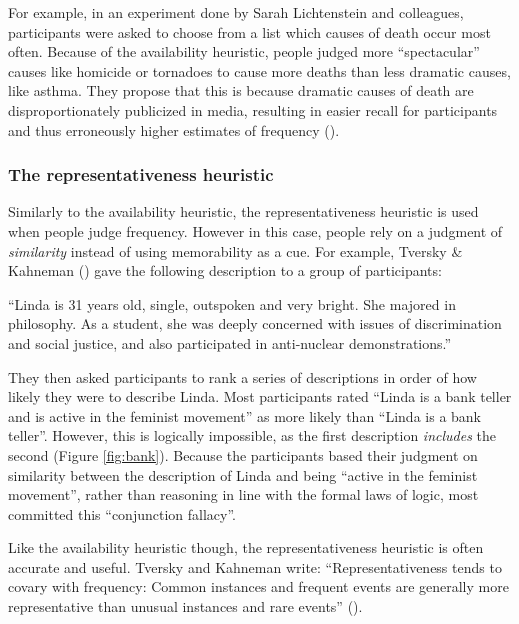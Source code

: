 \documentclass[
]{krantz}
\begin{document}
For example, in an experiment done by Sarah Lichtenstein and colleagues, participants were asked to choose from a list which causes of death occur most often. Because of the availability heuristic, people judged more ``spectacular'' causes like homicide or tornadoes to cause more deaths than less dramatic causes, like asthma. They propose that this is because dramatic causes of death are disproportionately publicized in media, resulting in easier recall for participants and thus erroneously higher estimates of frequency ().

\subsubsection*{The representativeness heuristic}\label{the-representativeness-heuristic}


Similarly to the availability heuristic, the representativeness heuristic is used when people judge frequency. However in this case, people rely on a judgment of \emph{similarity} instead of using memorability as a cue. For example, Tversky \& Kahneman () gave the following description to a group of participants:

``Linda is 31 years old, single, outspoken and very bright. She majored in philosophy. As a student, she was deeply concerned with issues of discrimination and social justice, and also participated in anti-nuclear demonstrations.''

They then asked participants to rank a series of descriptions in order of how likely they were to describe Linda. Most participants rated ``Linda is a bank teller and is active in the feminist movement'' as more likely than ``Linda is a bank teller''. However, this is logically impossible, as the first description \emph{includes} the second (Figure \ref{fig:bank}). Because the participants based their judgment on similarity between the description of Linda and being ``active in the feminist movement'', rather than reasoning in line with the formal laws of logic, most committed this ``conjunction fallacy''.

Like the availability heuristic though, the representativeness heuristic is often accurate and useful. Tversky and Kahneman write: ``Representativeness tends to covary with frequency: Common instances and frequent events are generally more representative than unusual instances and rare events'' ().
\end{document}
